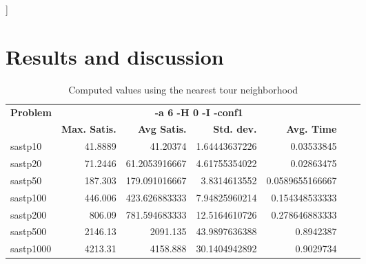 \documentclass{article}
\begin{document}
]


\section{Results and discussion}


\begin{table}[b!]
  \vspace{-6mm}%
  \caption{Computed values using the nearest tour neighborhood}
  \label{tab:NearestTour}
  \setlength{\tabcolsep}{1.4mm}
  \centering
  \begin{tabular}{lrrrrrr}
   \multirow{2}{*}{\bfseries Problem} &
      \multicolumn{4}{c}{\bfseries -a 6 -H 0 -I -conf1 } \\
    &
    \bfseries Max. Satis. &
    \bfseries Avg Satis. &
    \bfseries Std. dev. &
    \bfseries Avg. Time 
    \\\hline
    sastp10 & 41.8889 & 41.20374 & 1.64443637226 & 0.03533845 \\ 
	sastp20 & 71.2446 & 61.2053916667 & 4.61755354022 & 0.02863475 \\ 
	sastp50 & 187.303 & 179.091016667 & 3.8314613552 & 0.0589655166667 \\ 
	sastp100 & 446.006 & 423.626883333 & 7.94825960214 & 0.154348533333 \\ 
	sastp200 & 806.09 & 781.594683333 & 12.5164610726 & 0.278646883333 \\ 
	sastp500 & 2146.13 & 2091.135 & 43.9897636388 & 0.8942387 \\ 
	sastp1000 & 4213.31 & 4158.888 & 30.1404942892 & 0.9029734 

    \\\hline
  \end{tabular}

\end{table}
\end{document}
